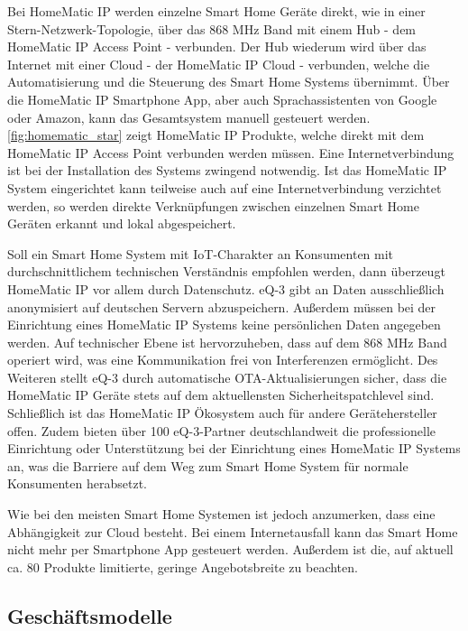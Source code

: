 Bei HomeMatic IP werden einzelne Smart Home Geräte direkt, wie in einer Stern-Netzwerk-Topologie, über das 868 MHz Band mit einem Hub - dem HomeMatic IP Access Point - verbunden.
Der Hub wiederum wird über das Internet mit einer Cloud - der HomeMatic IP Cloud - verbunden, welche die Automatisierung und die Steuerung des Smart Home Systems übernimmt.
Über die HomeMatic IP Smartphone App, aber auch Sprachassistenten von Google oder Amazon, kann das Gesamtsystem manuell gesteuert werden.
\autoref{fig:homematic_star} zeigt HomeMatic IP Produkte, welche direkt mit dem HomeMatic IP Access Point verbunden werden müssen.
Eine Internetverbindung ist bei der Installation des Systems zwingend notwendig.
Ist das HomeMatic IP System eingerichtet kann teilweise auch auf eine Internetverbindung verzichtet werden, so werden direkte Verknüpfungen zwischen einzelnen Smart Home Geräten erkannt und lokal abgespeichert.

Soll ein Smart Home System mit \ac{IoT}-Charakter an Konsumenten mit durchschnittlichem technischen Verständnis empfohlen werden, dann überzeugt HomeMatic IP vor allem durch Datenschutz.
eQ-3 gibt an Daten ausschließlich anonymisiert auf deutschen Servern abzuspeichern.
Außerdem müssen bei der Einrichtung eines HomeMatic IP Systems keine persönlichen Daten angegeben werden.
Auf technischer Ebene ist hervorzuheben, dass auf dem 868 MHz Band operiert wird, was eine Kommunikation frei von Interferenzen ermöglicht.
Des Weiteren stellt eQ-3 durch automatische \ac{OTA}-Aktualisierungen sicher, dass die HomeMatic IP Geräte stets auf dem aktuellensten Sicherheitspatchlevel sind.
Schließlich ist das HomeMatic IP Ökosystem auch für andere Gerätehersteller offen.
Zudem bieten über 100 eQ-3-Partner deutschlandweit die professionelle Einrichtung oder Unterstützung bei der Einrichtung eines HomeMatic IP Systems an, was die Barriere auf dem Weg zum Smart Home System für normale Konsumenten herabsetzt.

Wie bei den meisten Smart Home Systemen ist jedoch anzumerken, dass eine Abhängigkeit zur Cloud besteht.
Bei einem Internetausfall kann das Smart Home nicht mehr per Smartphone App gesteuert werden.
Außerdem ist die, auf aktuell ca. 80 Produkte limitierte, geringe Angebotsbreite zu beachten.

\subsection{Geschäftsmodelle}

